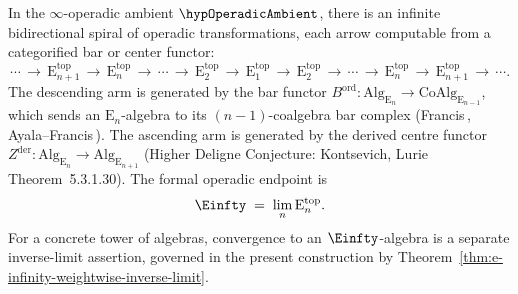 \begin{theorem}
\label{thm:operadic-spiral}
In the \(\infty\)-operadic ambient \(\hypOperadicAmbient\), there is an
infinite bidirectional spiral of operadic transformations,
each arrow computable from a categorified bar or center functor:
\begin{equation}\label{eq:operadic-spiral}
\cdots \,\longrightarrow\,
\mathrm{E}_{n+1}^{\mathrm{top}} \,\longrightarrow\,
\mathrm{E}_n^{\mathrm{top}} \,\longrightarrow\, \cdots \,\longrightarrow\,
\mathrm{E}_2^{\mathrm{top}} \,\longrightarrow\,
\mathrm{E}_1^{\mathrm{top}} \,\longrightarrow\,
\mathrm{E}_2^{\mathrm{top}} \,\longrightarrow\, \cdots \,\longrightarrow\,
\mathrm{E}_n^{\mathrm{top}} \,\longrightarrow\,
\mathrm{E}_{n+1}^{\mathrm{top}} \,\longrightarrow\, \cdots.
\end{equation}
The descending arm is generated by the bar functor
$B^{\mathrm{ord}}\colon \mathrm{Alg}_{\mathrm{E}_n} \to
\mathrm{CoAlg}_{\mathrm{E}_{n-1}}$, which sends an
$\mathrm{E}_n$-algebra to its $(n-1)$-coalgebra bar complex
\textup{(}Francis\,\cite{Francis-tangent},
Ayala--Francis\,\cite{AF15}\textup{)}. The ascending arm is generated
by the derived centre functor
$Z^{\mathrm{der}}\colon \mathrm{Alg}_{\mathrm{E}_n}
\to \mathrm{Alg}_{\mathrm{E}_{n+1}}$
\textup{(}Higher Deligne Conjecture: Kontsevich, Lurie\,\cite{HA}
Theorem~5.3.1.30\textup{)}. The formal operadic endpoint is
\begin{equation}\label{eq:einfty-as-limit}
\Einfty \;=\; \lim_n \mathrm{E}_n^{\mathrm{top}} .
\end{equation}
For a concrete tower of algebras, convergence to an
$\Einfty$-algebra is a separate inverse-limit assertion, governed in
the present construction by
Theorem~\ref{thm:e-infinity-weightwise-inverse-limit}.
\end{theorem}

